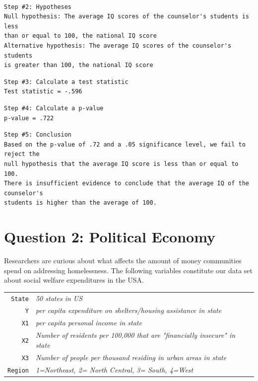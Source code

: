 \documentclass[12pt,letterpaper]{article}
\begin{document}
\begin{verbatim}

Step #2: Hypotheses
Null hypothesis: The average IQ scores of the counselor's students is less 
than or equal to 100, the national IQ score
Alternative hypothesis: The average IQ scores of the counselor's students 
is greater than 100, the national IQ score

\end{verbatim}

\begin{verbatim}
Step #3: Calculate a test statistic
Test statistic = -.596
\end{verbatim}



\begin{verbatim}
Step #4: Calculate a p-value
p-value = .722
\end{verbatim}


\begin{verbatim}
Step #5: Conclusion
Based on the p-value of .72 and a .05 significance level, we fail to reject the
null hypothesis that the average IQ score is less than or equal to 100. 
There is insufficient evidence to conclude that the average IQ of the counselor's
students is higher than the average of 100. 
\end{verbatim}


\newpage

	\section*{Question 2: Political Economy}

\noindent Researchers are curious about what affects the amount of money communities spend on addressing homelessness. The following variables constitute our data set about social welfare expenditures in the USA. \\
\vspace{.5cm}


\begin{tabular}{r|l}
	\texttt{State} &\emph{50 states in US} \\
	\texttt{Y} & \emph{per capita expenditure on shelters/housing assistance in state}\\
	\texttt{X1} &\emph{per capita personal income in state} \\
	\texttt{X2} &  \emph{Number of residents per 100,000 that are "financially insecure" in state}\\
	\texttt{X3} &  \emph{Number of people per thousand residing in urban areas in state} \\
	\texttt{Region} &  \emph{1=Northeast, 2= North Central, 3= South, 4=West} \\
\end{tabular}
\end{document}
